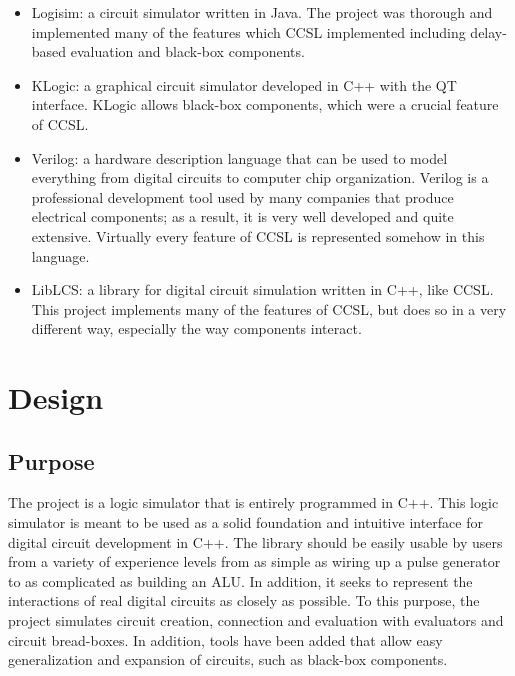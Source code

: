 \documentclass{article}
\begin{document}
\begin{itemize}

\item Logisim: a circuit simulator written in Java. The project was thorough and implemented many of the features which CCSL implemented including delay-based evaluation and black-box components.

\item KLogic: a graphical circuit simulator developed in C++ with the QT interface. KLogic allows black-box components, which were a crucial feature of CCSL.

\item Verilog: a hardware description language that can be used to model everything from digital circuits to computer chip organization. Verilog is a professional development tool used by many companies that produce electrical components; as a result, it is very well developed and quite extensive. Virtually every feature of CCSL is represented somehow in this language.

\item LibLCS: a library for digital circuit simulation written in C++, like CCSL. This project implements many of the features of CCSL, but does so in a very different way, especially the way components interact.

\end{itemize}

\section{Design}

\subsection{Purpose}

The project is a logic simulator that is entirely programmed in C++. This logic simulator is meant to be used as a solid foundation and intuitive interface for digital circuit development in C++. The library should be easily usable by users from a variety of experience levels from as simple as wiring up a pulse generator to as complicated as building an ALU. In addition, it seeks to represent the interactions of real digital circuits as closely as possible. To this purpose, the project simulates circuit creation, connection and evaluation with evaluators and circuit bread-boxes. In addition, tools have been added that allow easy generalization and expansion of circuits, such as black-box components.
\end{document}
